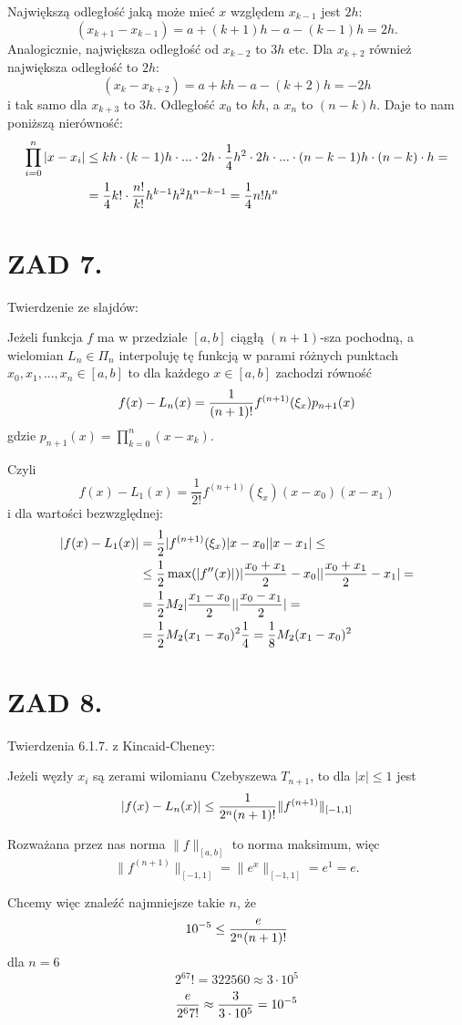 \documentclass{article}[16pt]
\begin{document}
Największą odległość jaką może mieć $x$ względem $x_{k-1}$ jest $2h$:
$$(x_{k+1}-x_{k-1})=a+(k+1)h-a-(k-1)h=2h.$$
Analogicznie, największa odległość od $x_{k-2}$ to $3h$ etc. Dla $x_{k+2}$ również największa odległość to $2h$:
$$(x_k-x_{k+2})=a+kh-a-(k+2)h=-2h$$
i tak samo dla $x_{k+3}$ to $3h$. Odległość $x_0$ to $kh$, a $x_n$ to $(n-k)h$. Daje to nam poniższą nierówność:
\begin{align*}
    \prod\limits_{i=0}^n|x-x_i|&\leq kh\cdot (k-1)h\cdot...\cdot 2h\cdot \frac14h^2\cdot 2h\cdot...\cdot (n-k-1)h\cdot (n-k)\cdot h=\\
    &=\frac14 k!\cdot {n!\over k!} h^{k-1}h^2h^{n-k-1}=\frac14n!h^n
\end{align*}


\section*{ZAD 7.}

Twierdzenie ze slajdów:

Jeżeli funkcja $f$ ma w przedziale $[a,b]$ ciągłą $(n+1)$-sza pochodną, a wielomian $L_n\in\Pi_n$ interpoluję tę funkcją w parami różnych punktach $x_0,x_1,...,x_n\in[a,b]$ to dla każdego $x\in[a,b]$ zachodzi równość
$$f(x)-L_n(x)={1\over (n+1)!}f^{(n+1)}(\xi_x)p_{n+1}(x)$$
gdzie $p_{n+1}(x)=\prod\limits_{k=0}^n(x-x_k)$.

Czyli
$$f(x)-L_1(x)=\frac1{2!}f^{(n+1)}(\xi_x)(x-x_0)(x-x_1)$$
i dla wartości bezwzględnej:
\begin{align*}
    |f(x)-L_1(x)|&= \frac12|f^{(n+1)}(\xi_x)|x-x_0||x-x_1|\leq\\
    &\leq \frac12\max(|f''(x)|)|{x_0+x_1\over2}-x_0||{x_0+x_1\over2}-x_1|=\\
    &=\frac12M_2|{x_1-x_0\over2}||{x_0-x_1\over2}|=\\
    &=\frac12M_2(x_1-x_0)^2\frac14=\frac18M_2(x_1-x_0)^2
\end{align*}

\section*{ZAD 8.}

Twierdzenia 6.1.7. z Kincaid-Cheney:

Jeżeli węzły $x_i$ są zerami wilomianu Czebyszewa $T_{n+1}$, to dla $|x|\leq 1$ jest
$$|f(x)-L_n(x)|\leq{1\over 2^n(n+1)!}\|f^{(n+1)}\|_{[-1,1]}$$

Rozważana przez nas norma $\|f\|_{[a,b]}$ to norma maksimum, więc
$$\|f^{(n+1)}\|_{[-1,1]}=\|e^x\|_{[-1,1]}=e^1=e.$$

Chcemy więc znaleźć najmniejsze takie $n$, że
$$10^{-5}\leq {e\over 2^n(n+1)!}$$
dla $n=6$
$$2^67!=322560\approx 3\cdot 10^5$$
$${e\over 2^67!}\approx {3\over 3\cdot 10^5}=10^{-5}$$
\end{document}

